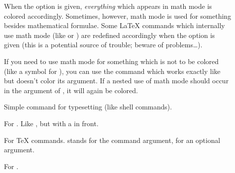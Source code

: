   \begin{description}
  \item[] When the  option is given, \emph{everything} which appears in
    math mode is colored accordingly. Sometimes, however, math mode is used for something besides mathematical formulae.
    Some \LaTeX{} commands which internally use math mode (like  or ) are
    redefined accordingly when the  option is given (this is a potential source of trouble; beware of
    problems\dots).
    
    If you need to use math mode for something which is not to be colored (like a symbol for ), you can
    use the  command which works exactly like  but doesn't color its argument.
    If a nested use of math mode should occur in the argument of , it will again be colored.
  \end{description}
    
  \newslide

  \begin{description}
  \item[] Simple command for typesetting  (like shell commands).
    
  \item[] For . Like , but with a \macroname{} in
    front.
    
  \item[] For \TeX{} commands. 
    stands for the command argument,  for an optional argument.
    
  \item[] For . 
  \end{description}
    
  \newslide

